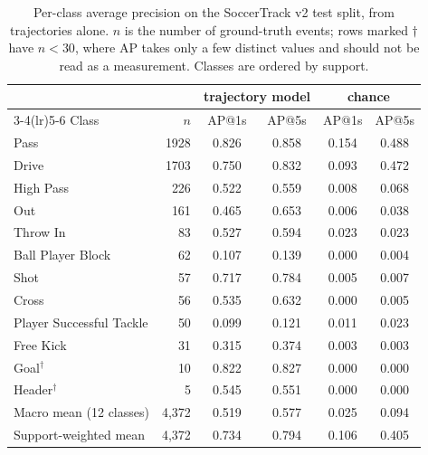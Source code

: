 \begin{table}[t]
  \centering
  \caption{Per-class average precision on the SoccerTrack v2 test split, from trajectories alone. $n$ is the number of ground-truth events; rows marked $\dagger$ have $n < 30$, where AP takes only a few distinct values and should not be read as a measurement. Classes are ordered by support.}
  \label{tab:bas_per_class}
  \small
  \begin{tabular}{lrcccc}
    \toprule
    & & \multicolumn{2}{c}{trajectory model} & \multicolumn{2}{c}{chance} \\
    \cmidrule(lr){3-4}\cmidrule(lr){5-6}
    Class & $n$ & AP@1s & AP@5s & AP@1s & AP@5s \\
    \midrule
    Pass & 1928 & 0.826 & 0.858 & 0.154 & 0.488 \\
    Drive & 1703 & 0.750 & 0.832 & 0.093 & 0.472 \\
    High Pass & 226 & 0.522 & 0.559 & 0.008 & 0.068 \\
    Out & 161 & 0.465 & 0.653 & 0.006 & 0.038 \\
    Throw In & 83 & 0.527 & 0.594 & 0.023 & 0.023 \\
    Ball Player Block & 62 & 0.107 & 0.139 & 0.000 & 0.004 \\
    Shot & 57 & 0.717 & 0.784 & 0.005 & 0.007 \\
    Cross & 56 & 0.535 & 0.632 & 0.000 & 0.005 \\
    Player Successful Tackle & 50 & 0.099 & 0.121 & 0.011 & 0.023 \\
    Free Kick & 31 & 0.315 & 0.374 & 0.003 & 0.003 \\
    Goal$^\dagger$ & 10 & 0.822 & 0.827 & 0.000 & 0.000 \\
    Header$^\dagger$ & 5 & 0.545 & 0.551 & 0.000 & 0.000 \\
    \midrule
    Macro mean (12 classes) & 4,372 & 0.519 & 0.577 & 0.025 & 0.094 \\
    Support-weighted mean & 4,372 & 0.734 & 0.794 & 0.106 & 0.405 \\
    \bottomrule
  \end{tabular}
\end{table}
